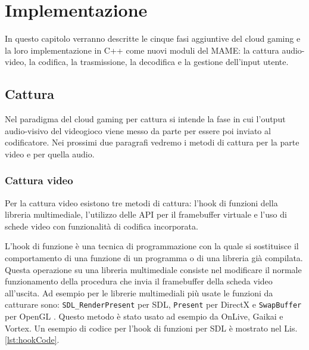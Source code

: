 %
%
\chapter{Implementazione}
In questo capitolo verranno descritte le cinque fasi aggiuntive del cloud gaming e la loro implementazione in C++ come nuovi moduli del MAME: la cattura audio-video, la codifica, la trasmissione, la decodifica e la gestione dell'input utente.




\section{Cattura}
Nel paradigma del cloud gaming per cattura si intende la fase in cui l'output audio-visivo del videogioco viene messo da parte per essere poi inviato al codificatore. Nei prossimi due paragrafi vedremo i metodi di cattura per la parte video e per quella audio.


\subsection{Cattura video} \label{subsec:cap3_Video}
Per la cattura video esistono tre metodi di cattura: l'hook di funzioni della libreria multimediale, l'utilizzo delle API per il framebuffer virtuale e l'uso di schede video con funzionalità di codifica incorporata.

L'hook di funzione è una tecnica di programmazione con la quale si sostituisce il comportamento di una funzione di un programma o di una libreria già compilata. Questa operazione su una libreria multimediale consiste nel modificare il normale funzionamento della procedura che invia il framebuffer della scheda video all'uscita. Ad esempio per le librerie multimediali più usate le funzioni da catturare sono: \verb|SDL_RenderPresent| per SDL, \verb|Present| per DirectX e \verb|SwapBuffer| per OpenGL \parencite{GamingAnywhere}. Questo metodo è stato usato ad esempio da OnLive, Gaikai e Vortex. Un esempio di codice per l'hook di funzioni per SDL è mostrato nel Lis. \ref{lst:hookCode}.

